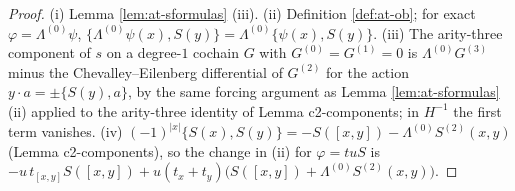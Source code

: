 \documentclass[11pt]{article}
\numberwithin{equation}{section}
\theoremstyle{plain}
\theoremstyle{definition}
\begin{document}
\begin{proof}
(i) Lemma \ref{lem:at-sformulas} (iii). (ii) Definition \ref{def:at-ob}; for exact $\varphi=\Lambda^{(0)}\psi$, $\{\Lambda^{(0)}\psi(x),S(y)\}=\Lambda^{(0)}\{\psi(x),S(y)\}$. (iii) The arity-three component of $s$ on a degree-$1$ cochain $G$ with $G^{(0)}=G^{(1)}=0$ is $\Lambda^{(0)}G^{(3)}$ minus the Chevalley--Eilenberg differential of $G^{(2)}$ for the action $y\cdot a=\pm\{S(y),a\}$, by the same forcing argument as Lemma \ref{lem:at-sformulas} (ii) applied to the arity-three identity of Lemma c2-components; in $H^{-1}$ the first term vanishes. (iv) $(-1)^{|x|}\{S(x),S(y)\}=-S([x,y])-\Lambda^{(0)}S^{(2)}(x,y)$ (Lemma c2-components), so the change in (ii) for $\varphi=tuS$ is $-u\,t_{[x,y]}S([x,y])+u(t_x+t_y)\big(S([x,y])+\Lambda^{(0)}S^{(2)}(x,y)\big)$.
\end{proof}
\end{document}
